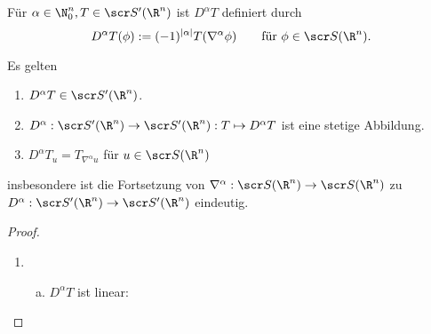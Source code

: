 \begin{st}[Ableitung] \label{5.55}
	Für $\alpha \in \N_0^n, T\in \scr S'(\R^n)$ ist $D^\alpha T$ definiert durch
	\[
		D^\alpha T (\phi)
		:= (-1)^{|\alpha|} T(\nabla^\alpha \phi)
		\qquad \text{für $\phi \in \scr S(\R^n)$.}
	\]

	Es gelten
	\begin{enumerate}[1)]
		\item
			$D^\alpha T \in \scr S'(\R^n)$.
		\item
			$D^\alpha : \scr S'(\R^n) \to \scr S'(\R^n) : T \mapsto D^\alpha T$ ist eine stetige Abbildung.
		\item
			$D^\alpha T_u = T_{\nabla^\alpha u}$ für $u \in \scr S(\R^n)$
	\end{enumerate}
	insbesondere ist die Fortsetzung von $\nabla^\alpha : \scr S(\R^n) \to \scr S(\R^n)$ zu $D^\alpha : \scr S'(\R^n) \to \scr S'(\R^n)$ eindeutig.
	\begin{proof}
		\begin{enumerate}[1)]
			\item
				\begin{enumerate}[a)]
					\item
						$D^\alpha T$ ist linear:


\end{enumerate}
\end{enumerate}
\end{proof}
\end{st}
